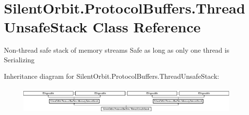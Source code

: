 \hypertarget{class_silent_orbit_1_1_protocol_buffers_1_1_thread_unsafe_stack}{}\section{Silent\+Orbit.\+Protocol\+Buffers.\+Thread\+Unsafe\+Stack Class Reference}
\label{class_silent_orbit_1_1_protocol_buffers_1_1_thread_unsafe_stack}


Non-\/thread safe stack of memory streams Safe as long as only one thread is Serializing  


Inheritance diagram for Silent\+Orbit.\+Protocol\+Buffers.\+Thread\+Unsafe\+Stack\+:\begin{figure}[H]
\begin{center}
\leavevmode
\includegraphics[height=1.443299cm]{class_silent_orbit_1_1_protocol_buffers_1_1_thread_unsafe_stack}
\end{center}
\end{figure}
